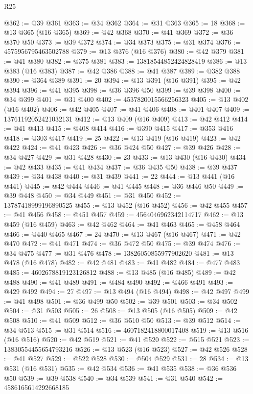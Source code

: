 \begin{lexlean}{R25}
\begin{coremodule}
@362 := @39 @361
@363 := @34 @362
@364 := @31 @363
@365 := 18
@368 := @13 @365 (@16 @365)
@369 := @42 @368
@370 := @41 @369
@372 := @36 @370 @50
@373 := @39 @372
@374 := @34 @373
@375 := @31 @374
@376 := 4575956795463502788
@379 := @13 @376 (@16 @376)
@380 := @42 @379
@381 := @41 @380
@382 := @375 @381
@383 := 13818544852424828419
@386 := @13 @383 (@16 @383)
@387 := @42 @386
@388 := @41 @387
@389 := @382 @388
@390 := @364 @389
@391 := 20
@394 := @13 @391 (@16 @391)
@395 := @42 @394
@396 := @41 @395
@398 := @36 @396 @50
@399 := @39 @398
@400 := @34 @399
@401 := @31 @400
@402 := 4537820015566256323
@405 := @13 @402 (@16 @402)
@406 := @42 @405
@407 := @41 @406
@408 := @401 @407
@409 := 13761192052421032131
@412 := @13 @409 (@16 @409)
@413 := @42 @412
@414 := @41 @413
@415 := @408 @414
@416 := @390 @415
@417 := @353 @416
@418 := @303 @417
@419 := 25
@422 := @13 @419 (@16 @419)
@423 := @42 @422
@424 := @41 @423
@426 := @36 @424 @50
@427 := @39 @426
@428 := @34 @427
@429 := @31 @428
@430 := 23
@433 := @13 @430 (@16 @430)
@434 := @42 @433
@435 := @41 @434
@437 := @36 @435 @50
@438 := @39 @437
@439 := @34 @438
@440 := @31 @439
@441 := 22
@444 := @13 @441 (@16 @441)
@445 := @42 @444
@446 := @41 @445
@448 := @36 @446 @50
@449 := @39 @448
@450 := @34 @449
@451 := @31 @450
@452 := 13787418999196890525
@455 := @13 @452 (@16 @452)
@456 := @42 @455
@457 := @41 @456
@458 := @451 @457
@459 := 4564046962342114717
@462 := @13 @459 (@16 @459)
@463 := @42 @462
@464 := @41 @463
@465 := @458 @464
@466 := @440 @465
@467 := 24
@470 := @13 @467 (@16 @467)
@471 := @42 @470
@472 := @41 @471
@474 := @36 @472 @50
@475 := @39 @474
@476 := @34 @475
@477 := @31 @476
@478 := 13826050855977902620
@481 := @13 @478 (@16 @478)
@482 := @42 @481
@483 := @41 @482
@484 := @477 @483
@485 := 4602678819123126812
@488 := @13 @485 (@16 @485)
@489 := @42 @488
@490 := @41 @489
@491 := @484 @490
@492 := @466 @491
@493 := @429 @492
@494 := 27
@497 := @13 @494 (@16 @494)
@498 := @42 @497
@499 := @41 @498
@501 := @36 @499 @50
@502 := @39 @501
@503 := @34 @502
@504 := @31 @503
@505 := 26
@508 := @13 @505 (@16 @505)
@509 := @42 @508
@510 := @41 @509
@512 := @36 @510 @50
@513 := @39 @512
@514 := @34 @513
@515 := @31 @514
@516 := 4607182418800017408
@519 := @13 @516 (@16 @516)
@520 := @42 @519
@521 := @41 @520
@522 := @515 @521
@523 := 13830554455654793216
@526 := @13 @523 (@16 @523)
@527 := @42 @526
@528 := @41 @527
@529 := @522 @528
@530 := @504 @529
@531 := 28
@534 := @13 @531 (@16 @531)
@535 := @42 @534
@536 := @41 @535
@538 := @36 @536 @50
@539 := @39 @538
@540 := @34 @539
@541 := @31 @540
@542 := 4586165614292668185

\end{coremodule}
\end{lexlean}
